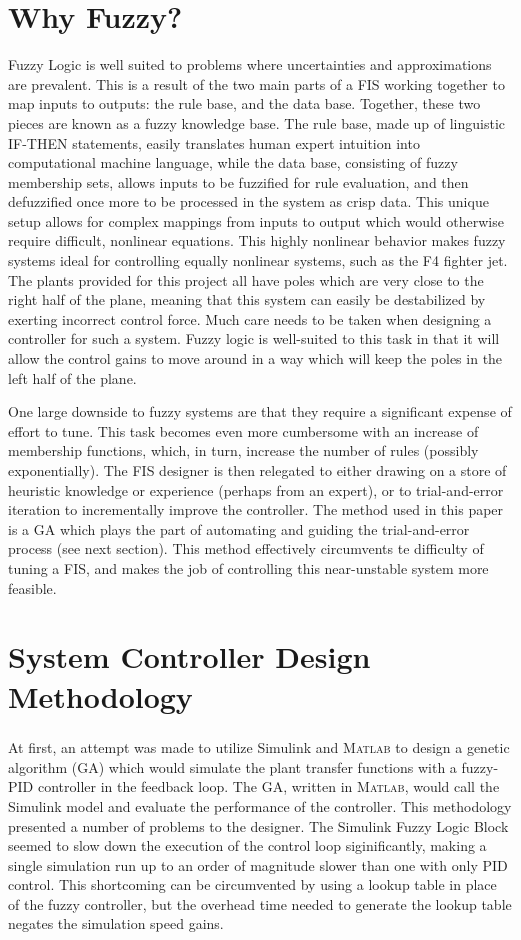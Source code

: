 \documentclass[12pt]{article}
\begin{document}
\section{Why Fuzzy?}
Fuzzy Logic is well suited to problems where uncertainties and approximations are prevalent. This is a result of the two main parts of a FIS working together to map inputs to outputs: the rule base, and the data base. Together, these two pieces are known as a fuzzy knowledge base. The rule base, made up of linguistic IF-THEN statements, easily translates human expert intuition into computational machine language, while the data base, consisting of fuzzy membership sets, allows inputs to be fuzzified for rule evaluation, and then defuzzified once more to be processed in the system as crisp data. This unique setup allows for complex mappings from inputs to output which would otherwise require difficult, nonlinear equations. This highly nonlinear behavior makes fuzzy systems ideal for controlling equally nonlinear systems, such as the F4 fighter jet. The plants provided for this project all have poles which are very close to the right half of the plane, meaning that this system can easily be destabilized by exerting incorrect control force. Much care needs to be taken when designing a controller for such a system. Fuzzy logic is well-suited to this task in that it will allow the control gains to move around in a way which will keep the poles in the left half of the plane.

One large downside to fuzzy systems are that they require a significant expense of effort to tune. This task becomes even more cumbersome with an increase of membership functions, which, in turn, increase the number of rules (possibly exponentially). The FIS designer is then relegated to either drawing on a store of heuristic knowledge or experience (perhaps from an expert), or to trial-and-error iteration to incrementally improve the controller. The method used in this paper is a GA which plays the part of automating and guiding the trial-and-error process (see next section). This method effectively circumvents te difficulty of tuning a FIS, and makes the job of controlling this near-unstable system more feasible.

\section{System Controller Design Methodology}
At first, an attempt was made to utilize Simulink\textsuperscript{\textregistered} and \textsc{Matlab}\textsuperscript{\textregistered} to design a genetic algorithm (GA) which would simulate the plant transfer functions with a fuzzy-PID controller in the feedback loop. The GA, written in \textsc{Matlab}, would call the Simulink model and evaluate the performance of the controller. This methodology presented a number of problems to the designer. The Simulink Fuzzy Logic Block seemed to slow down the execution of the control loop siginificantly, making a single simulation run up to an order of magnitude slower than one with only PID control. This shortcoming can be circumvented by using a lookup table in place of the fuzzy controller, but the overhead time needed to generate the lookup table negates the simulation speed gains.
\end{document}
